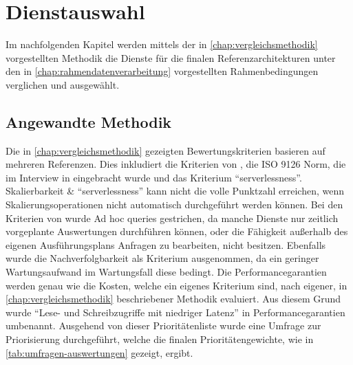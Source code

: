 \chapter{Dienstauswahl}
Im nachfolgenden Kapitel werden mittels der in \autoref{chap:vergleichsmethodik} vorgestellten Methodik die Dienste für die finalen Referenzarchitekturen unter den in \autoref{chap:rahmendatenverarbeitung} vorgestellten Rahmenbedingungen verglichen und ausgewählt.

\section{Angewandte Methodik}
Die  in \autoref{chap:vergleichsmethodik} gezeigten Bewertungskriterien basieren auf mehreren Referenzen. Dies inkludiert die Kriterien von \citeauthor{Marz.2015}, die ISO 9126 Norm, die im Interview in  eingebracht wurde und das Kriterium \enquote{serverlessness}. Skalierbarkeit \& \enquote{serverlessness} kann nicht die volle Punktzahl erreichen, wenn Skalierungsoperationen nicht automatisch durchgeführt werden können. Bei den Kriterien von \citeauthor{Marz.2015} wurde Ad hoc queries gestrichen, da manche Dienste nur zeitlich vorgeplante Auswertungen durchführen können, oder die Fähigkeit außerhalb des eigenen Ausführungsplans Anfragen zu bearbeiten, nicht besitzen. Ebenfalls wurde die Nachverfolgbarkeit als Kriterium ausgenommen, da ein geringer Wartungsaufwand im Wartungsfall diese bedingt. Die Performancegarantien werden genau wie die Kosten, welche ein eigenes Kriterium sind, nach eigener, in \autoref{chap:vergleichsmethodik} beschriebener Methodik evaluiert. Aus diesem Grund wurde \enquote{Lese- und Schreibzugriffe mit niedriger Latenz} in Performancegarantien umbenannt. Ausgehend von dieser Prioritätenliste wurde eine Umfrage zur Priorisierung durchgeführt, welche die finalen Prioritätengewichte, wie in \autoref{tab:umfragen-auswertungen} gezeigt, ergibt. 

